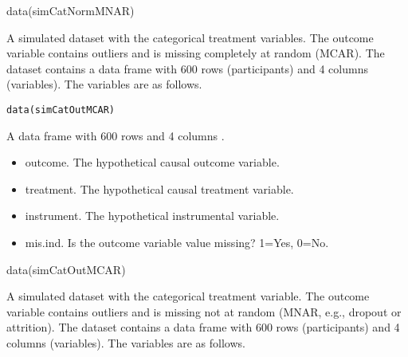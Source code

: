 \documentclass[a4paper]{book}
\begin{document}
%
\begin{Examples}
\begin{ExampleCode}

data(simCatNormMNAR)


\end{ExampleCode}
\end{Examples}
%
\begin{Description}\relax
A simulated dataset with the categorical treatment variables. The outcome variable contains
outliers and is missing completely at random (MCAR).
The dataset contains a data frame with 600 rows (participants) and 4 columns (variables).
The variables are as follows.
\end{Description}
%
\begin{Usage}
\begin{verbatim}
data(simCatOutMCAR)
\end{verbatim}
\end{Usage}
%
\begin{Format}
A data frame with 600 rows and 4 columns .
\end{Format}
%
\begin{Details}\relax
\begin{itemize}

\item outcome. The hypothetical causal outcome variable.
\item treatment. The hypothetical causal treatment variable.
\item instrument. The hypothetical instrumental variable.
\item mis.ind. Is the outcome variable value missing? 1=Yes, 0=No.

\end{itemize}

\end{Details}
%
\begin{Examples}
\begin{ExampleCode}

data(simCatOutMCAR)


\end{ExampleCode}
\end{Examples}
%
\begin{Description}\relax
A simulated dataset with the categorical treatment variable. The outcome variable contains
outliers and is missing not at random (MNAR, e.g., dropout or attrition).
The dataset contains a data frame with 600 rows (participants) and 4 columns (variables).
The variables are as follows.
\end{Description}
\end{document}
